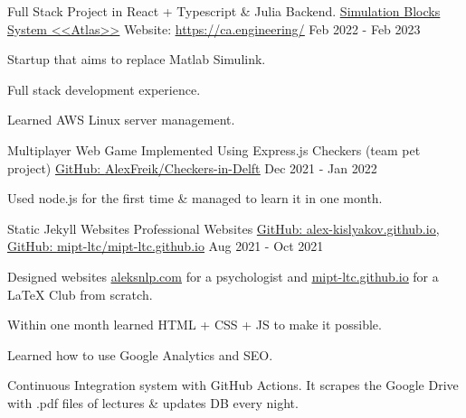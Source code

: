 
\newcommand{\gitHref}[1]{\href{https://github.com/#1}{GitHub: \underline{#1}}}
\newcommand{\myHref}[2]{\href{#1}{\underline{#2}}}

\begin{cventries}

  \cventry
    {Full Stack Project in React + Typescript \& Julia Backend.}
    {\href{https://ca.engineering/}{\underline{Simulation Blocks System <<Atlas>>}}} 
    {Website: \myHref{https://ca.engineering/}{https://ca.engineering/}} %
    {Feb 2022 - Feb 2023} %
    {
      \begin{cvitems} %
        \item {Startup that aims to replace Matlab Simulink.}
        \item {Full stack development experience.}
        \item {Learned AWS Linux server management.}
      \end{cvitems}
    }

  \cventry
    {Multiplayer Web Game Implemented Using Express.js}
    {Checkers (team pet project)} 
    {\gitHref{AlexFreik/Checkers-in-Delft}} %
    {Dec 2021 - Jan 2022} %
    {
      \begin{cvitems} %
        \item {Used node.js for the first time \& managed to learn it in one month.}
      \end{cvitems}
    }

  \cventry
    {Static Jekyll Websites}
    {Professional Websites} 
    {\gitHref{alex-kislyakov.github.io}, \gitHref{mipt-ltc/mipt-ltc.github.io}} %
    {Aug 2021 - Oct 2021} %
    {
      \begin{cvitems} %
        \item {Designed websites \myHref{https://aleksnlp.com/}{aleksnlp.com} for a psychologist and \myHref{https://mipt-ltc.github.io/}{mipt-ltc.github.io} for a LaTeX Club from scratch.}
        \item {Within one month learned HTML + CSS + JS to make it possible.}
        \item {Learned how to use Google Analytics and SEO.}
        \item {Continuous Integration system with GitHub Actions. It scrapes the Google Drive with .pdf files of lectures \& updates DB every night.}
      \end{cvitems}
    }


\end{cventries}
